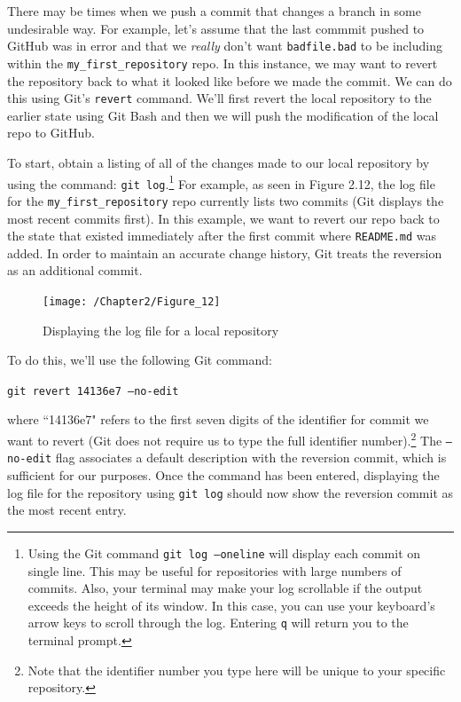 \documentclass{book}
\begin{document}
There may be times when we push a commit that changes a branch in some undesirable way. For example, let's assume that the last commmit pushed to GitHub was in error and that we \textit{really} don't want \texttt{badfile.bad} to be including within the \texttt{my\_first\_repository} repo. In this instance, we may want to revert the repository back to what it looked like before we made the commit. We can do this using Git's \texttt{revert} command. We'll first revert the local repository to the earlier state using Git Bash and then we will push the modification of the local repo to GitHub.

To start, obtain a listing of all of the changes made to our local repository by using the command: \texttt{git log}.\footnote{Using the Git command \texttt{git log --oneline} will display each commit on single line. This may be useful for repositories with large numbers of commits. Also, your terminal may make your log scrollable if the output exceeds the height of its window. In this case, you can use your keyboard's arrow keys to scroll through the log. Entering \texttt{q} will return you to the terminal prompt.} For example, as seen in Figure 2.12, the log file for the  \texttt{my\_first\_repository} repo currently lists two commits (Git displays the most recent commits first). In this example, we want to revert our repo back to the state that existed immediately after the first commit where \texttt{README.md} was added. In order to maintain an accurate change history, Git treats the reversion as an additional commit.

\begin{figure}[h]
	\caption{Displaying the log file for a local repository}
	\centering\texttt{[image: /Chapter2/Figure\_12]}
\end{figure}
 
 To do this, we'll use the following Git command:
 
 \texttt {git revert 14136e7 --no-edit}
 
 where ``14136e7" refers to the first seven digits of the identifier for commit we want to revert (Git does not require us to type the full identifier number).\footnote{Note that the identifier number you type here will be unique to your specific repository.} The \texttt{--no-edit} flag associates a default description with the reversion commit, which is sufficient for our purposes. Once the command has been entered, displaying the log file for the repository using \texttt{git log} should now show the reversion commit as the most recent entry.
 
\end{document}
